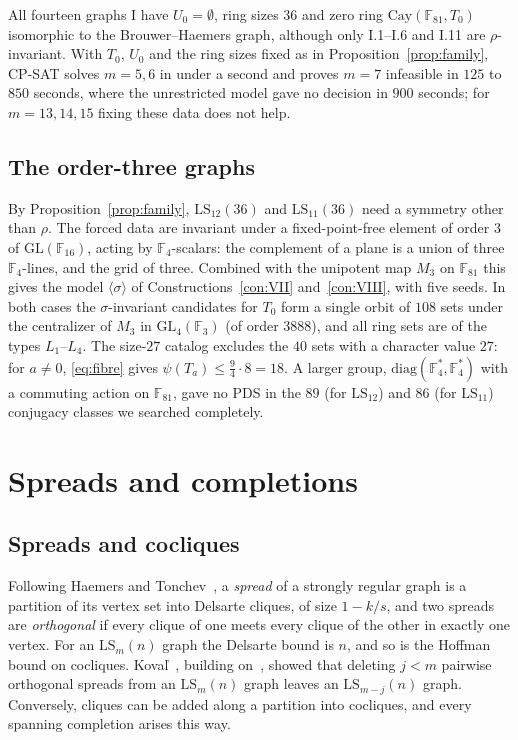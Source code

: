 \documentclass[11pt]{amsart}
\theoremstyle{definition}
\newcommand{\F}{\mathbb{F}}
\newcommand{\Cay}{\mathrm{Cay}}
\newcommand{\LS}{\mathrm{LS}}
\begin{document}
All fourteen graphs I have $U_0=\emptyset$, ring sizes $36$ and zero ring $\Cay(\F_{81},T_0)$ isomorphic to the Brouwer--Haemers graph, although only I.1--I.6 and I.11 are $\rho$-invariant. With $T_0$, $U_0$ and the ring sizes fixed as in Proposition~\ref{prop:family}, CP-SAT solves $m=5,6$ in under a second and proves $m=7$ infeasible in $125$ to $850$ seconds, where the unrestricted model gave no decision in $900$ seconds; for $m=13,14,15$ fixing these data does not help.

\subsection{The order-three graphs}\label{sec:outside}
By Proposition~\ref{prop:family}, $\LS_{12}(36)$ and $\LS_{11}(36)$ need a symmetry other than $\rho$. The forced data are invariant under a fixed-point-free element of order $3$ of $\mathrm{GL}(\F_{16})$, acting by $\F_4$-scalars: the complement of a plane is a union of three $\F_4$-lines, and the grid of three. Combined with the unipotent map $M_3$ on $\F_{81}$ this gives the model $\langle\sigma\rangle$ of Constructions~\ref{con:VII} and~\ref{con:VIII}, with five seeds. In both cases the $\sigma$-invariant candidates for $T_0$ form a single orbit of $108$ sets under the centralizer of $M_3$ in $\mathrm{GL}_4(\F_3)$ (of order $3888$), and all ring sets are of the types $L_1$--$L_4$. The size-$27$ catalog excludes the $40$ sets with a character value $27$: for $a\ne0$, \eqref{eq:fibre} gives $\psi(T_a)\le\frac94\cdot8=18$. A larger group, $\mathrm{diag}(\F_4^*,\F_4^*)$ with a commuting action on $\F_{81}$, gave no PDS in the $89$ (for $\LS_{12}$) and $86$ (for $\LS_{11}$) conjugacy classes we searched completely.

\section{Spreads and completions}\label{sec:spreads}\label{sec:properties}

\subsection{Spreads and cocliques}
Following Haemers and Tonchev~\cite{HaemersTonchev1996}, a \emph{spread} of a strongly regular graph is a partition of its vertex set into Delsarte cliques, of size $1-k/s$, and two spreads are \emph{orthogonal} if every clique of one meets every clique of the other in exactly one vertex. For an $\LS_m(n)$ graph the Delsarte bound is $n$, and so is the Hoffman bound on cocliques. Kova\v{l}~\cite[Lemma~4.1]{KovalMultiOrbit}, building on~\cite[Proposition~4.1]{HaemersTonchev1996}, showed that deleting $j<m$ pairwise orthogonal spreads from an $\LS_m(n)$ graph leaves an $\LS_{m-j}(n)$ graph. Conversely, cliques can be added along a partition into cocliques, and every spanning completion arises this way.
\end{document}
